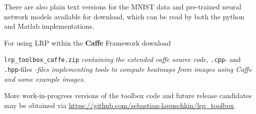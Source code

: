 \documentclass[a4wide]{article}
\begin{document}

\vspace{0.5cm}
There are also plain text versions for the MNIST data and pre-trained neural network models available for download, which can be read by both the python and Matlab implementations.




\vspace{0.5cm}
For using LRP within the \textbf{Caffe} Framework download

\texttt{lrp\_toolbox\_caffe.zip} \emph{containing the extended caffe source code,} \texttt{.cpp}- and \texttt{.hpp}-files \emph{-files implementing tools to compute heatmaps from images using Caffe and some example images.}

\vspace{0.5cm}
More work-in-progress versions of the toolbox code and future release candidates may be obtained via \url{https://github.com/sebastian-lapuschkin/lrp_toolbox}.
\end{document}
